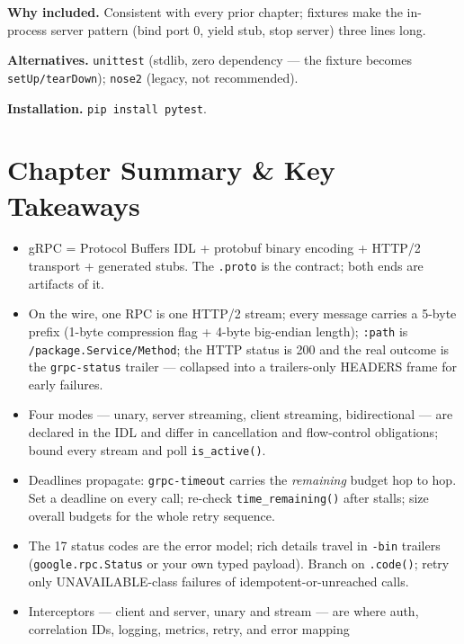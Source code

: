 \textbf{Why included.} Consistent with every prior chapter; fixtures make the
in-process server pattern (bind port 0, yield stub, stop server) three lines
long.

\textbf{Alternatives.} \texttt{unittest} (stdlib, zero dependency --- the
fixture becomes \texttt{setUp/tearDown}); \texttt{nose2} (legacy, not
recommended).

\textbf{Installation.} \texttt{pip install pytest}.

\section{Chapter Summary \& Key Takeaways}
\label{sec:ch13-summary}

\begin{itemize}
  \item gRPC = Protocol Buffers IDL + protobuf binary encoding + HTTP/2
        transport + generated stubs. The \texttt{.proto} is the contract; both
        ends are artifacts of it.
  \item On the wire, one RPC is one HTTP/2 stream; every message carries a
        5-byte prefix (1-byte compression flag + 4-byte big-endian length);
        \texttt{:path} is \texttt{/package.Service/Method}; the HTTP status is
        200 and the real outcome is the \texttt{grpc-status} trailer ---
        collapsed into a trailers-only HEADERS frame for early failures.
  \item Four modes --- unary, server streaming, client streaming,
        bidirectional --- are declared in the IDL and differ in cancellation
        and flow-control obligations; bound every stream and poll
        \texttt{is\_active()}.
  \item Deadlines propagate: \texttt{grpc-timeout} carries the
        \emph{remaining} budget hop to hop. Set a deadline on every call;
        re-check \texttt{time\_remaining()} after stalls; size overall budgets
        for the whole retry sequence.
  \item The 17 status codes are the error model; rich details travel in
        \texttt{-bin} trailers (\texttt{google.rpc.Status} or your own typed
        payload). Branch on \texttt{.code()}; retry only UNAVAILABLE-class
        failures of idempotent-or-unreached calls.
  \item Interceptors --- client and server, unary and stream --- are where
        auth, correlation IDs, logging, metrics, retry, and error mapping

\end{itemize}
